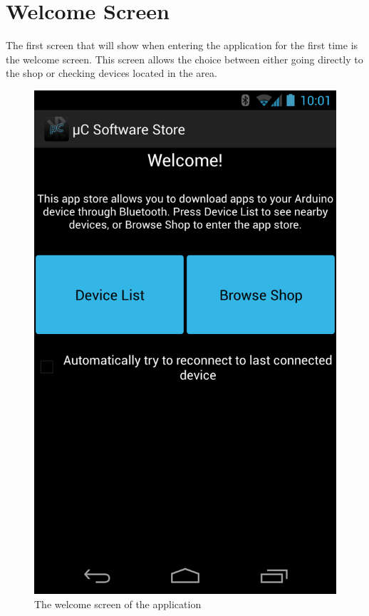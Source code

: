 	\section{Welcome Screen}
		The first screen that will show when entering the application for the first time is the welcome screen. This screen allows the choice between either going directly to the shop or checking devices located in the area. \\
		\newline
		\begin{figure}[H]
			\centering
			\includegraphics[scale = 0.3]{images/Screenshots/welcome_screen.png}
			\caption{The welcome screen of the application}
		\end{figure}

